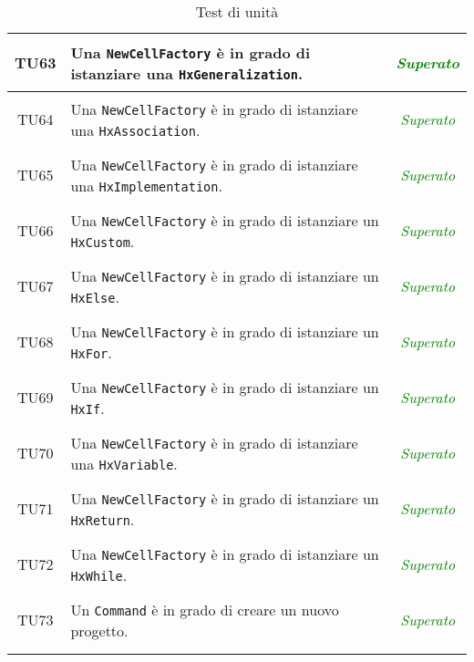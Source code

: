 \begin{longtable}{|c|>{}m{8cm}|c|}
\hypertarget{TU63}{TU63} & Una \texttt{NewCellFactory} è in grado di istanziare una \texttt{HxGeneralization}. & \textcolor{Green}{\textit{Superato}}\\ \hline
\hypertarget{TU64}{TU64} & Una \texttt{NewCellFactory} è in grado di istanziare una \texttt{HxAssociation}. & \textcolor{Green}{\textit{Superato}}\\ \hline
\hypertarget{TU65}{TU65} & Una \texttt{NewCellFactory} è in grado di istanziare una \texttt{HxImplementation}. & \textcolor{Green}{\textit{Superato}}\\ \hline
\hypertarget{TU66}{TU66} & Una \texttt{NewCellFactory} è in grado di istanziare un \texttt{HxCustom}. & \textcolor{Green}{\textit{Superato}}\\ \hline
\hypertarget{TU67}{TU67} & Una \texttt{NewCellFactory} è in grado di istanziare un \texttt{HxElse}. & \textcolor{Green}{\textit{Superato}}\\ \hline
\hypertarget{TU68}{TU68} & Una \texttt{NewCellFactory} è in grado di istanziare un \texttt{HxFor}. & \textcolor{Green}{\textit{Superato}}\\ \hline
\hypertarget{TU69}{TU69} & Una \texttt{NewCellFactory} è in grado di istanziare un \texttt{HxIf}. & \textcolor{Green}{\textit{Superato}}\\ \hline
\hypertarget{TU70}{TU70} & Una \texttt{NewCellFactory} è in grado di istanziare una \texttt{HxVariable}. & \textcolor{Green}{\textit{Superato}}\\ \hline
\hypertarget{TU71}{TU71} & Una \texttt{NewCellFactory} è in grado di istanziare un \texttt{HxReturn}. & \textcolor{Green}{\textit{Superato}}\\ \hline
\hypertarget{TU72}{TU72} & Una \texttt{NewCellFactory} è in grado di istanziare un \texttt{HxWhile}. & \textcolor{Green}{\textit{Superato}}\\ \hline
\hypertarget{TU73}{TU73} & Un \texttt{Command} è in grado di creare un nuovo progetto. & \textcolor{Green}{\textit{Superato}}\\ \hline
\caption[Test di unità]{Test di unità}
\label{tab:unit}
\end{longtable}
\clearpage


